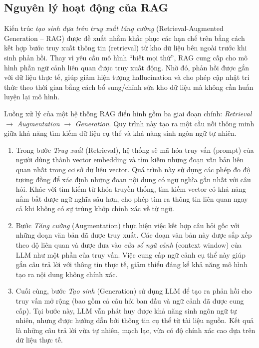\subsection{Nguyên lý hoạt động của RAG}

Kiến trúc \emph{tạo sinh dựa trên truy xuất tăng cường} (Retrieval-Augmented Generation -- RAG) được đề xuất nhằm khắc phục các hạn chế trên bằng cách kết hợp bước truy xuất thông tin (retrieval) từ kho dữ liệu bên ngoài trước khi sinh phản hồi. Thay vì yêu cầu mô hình ``biết mọi thứ'', RAG cung cấp cho mô hình phần ngữ cảnh liên quan được truy xuất động. Nhờ đó, phản hồi được gắn với dữ liệu thực tế, giúp giảm hiện tượng hallucination và cho phép cập nhật tri thức theo thời gian bằng cách bổ sung/chỉnh sửa kho dữ liệu mà không cần huấn luyện lại mô hình.

Luồng xử lý của một hệ thống RAG điển hình gồm ba giai đoạn chính: \emph{Retrieval} \(\rightarrow\) \emph{Augmentation} \(\rightarrow\) \emph{Generation}. Quy trình này tạo ra một cầu nối thông minh giữa khả năng tìm kiếm dữ liệu cụ thể và khả năng sinh ngôn ngữ tự nhiên.

\begin{enumerate}
    \item Trong bước \emph{Truy xuất} (Retrieval), hệ thống sẽ mã hóa truy vấn (prompt) của người dùng thành vector embedding và tìm kiếm những đoạn văn bản liên quan nhất trong cơ sở dữ liệu vector. Quá trình này sử dụng các phép đo độ tương đồng để xác định những đoạn nội dung có ngữ nghĩa gần nhất với câu hỏi. Khác với tìm kiếm từ khóa truyền thống, tìm kiếm vector có khả năng nắm bắt được ngữ nghĩa sâu hơn, cho phép tìm ra thông tin liên quan ngay cả khi không có sự trùng khớp chính xác về từ ngữ.

    \item Bước \emph{Tăng cường} (Augmentation) thực hiện việc kết hợp câu hỏi gốc với những đoạn văn bản đã được truy xuất. Các đoạn văn bản này được sắp xếp theo độ liên quan và được đưa vào \emph{cửa sổ ngữ cảnh} (context window) của LLM như một phần của truy vấn. Việc cung cấp ngữ cảnh cụ thể này giúp gắn câu trả lời với thông tin thực tế, giảm thiểu đáng kể khả năng mô hình tạo ra nội dung không chính xác.

    \item Cuối cùng, bước \emph{Tạo sinh} (Generation) sử dụng LLM để tạo ra phản hồi cho truy vấn mở rộng (bao gồm cả câu hỏi ban đầu và ngữ cảnh đã được cung cấp). Tại bước này, LLM vẫn phát huy được khả năng sinh ngôn ngữ tự nhiên, nhưng được hướng dẫn bởi thông tin cụ thể từ tài liệu nguồn. Kết quả là những câu trả lời vừa tự nhiên, mạch lạc, vừa có độ chính xác cao dựa trên dữ liệu thực tế.
\end{enumerate}

